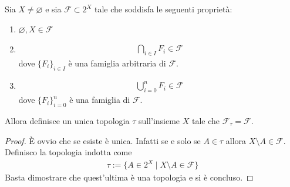 \begin{lemma}
	Sia $X \neq \varnothing$ e sia $\mathcal{F} \subset 2^X$ tale che soddisfa le seguenti proprietà:
		\begin{enumerate}
		\item $\varnothing, X \in \mathcal{F}$
		\item \begin{equation}
		\begin{aligned}
		\bigcap_{i \in I} F_i \in \mathcal{F}
		\end{aligned}
		\end{equation}
		dove $\{F_i\}_{i\in I}$ è una famiglia arbitraria di $\mathcal{F}$.
		\item \begin{equation}
		\begin{aligned}
		\bigcup^{n}_{i = 0} F_i \in \mathcal{F}
		\end{aligned}
		\end{equation}
		dove $\{F_i\}^n_{i=0}$ è una famiglia di $\mathcal{F}$.
	\end{enumerate}
	Allora definisce un unica topologia $\tau$ sull'insieme $X$ tale che $\mathcal{F}_\tau = \mathcal{F}$.
\end{lemma}
\begin{proof}
	È ovvio che se esiste è unica. Infatti se e solo se $A \in \tau$ allora $X \setminus A \in \mathcal{F}$. Definisco la topologia indotta come 
	\begin{equation}
	\begin{aligned}	
		\tau := \{ A \in 2^X \; | \; X \setminus A \in \mathcal{F} \}
	\end{aligned}
	\end{equation}
	Basta dimostrare che quest'ultima è una topologia e si è concluso.
\end{proof}


